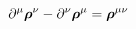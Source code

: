 \begin{equation}
\partial^\mu \mbox{\boldmath$\rho$}^\nu -  \partial^\nu \mbox{\boldmath$\rho$}^\mu= \mbox{\boldmath$\rho$}^{\mu\nu} 
\end{equation}

